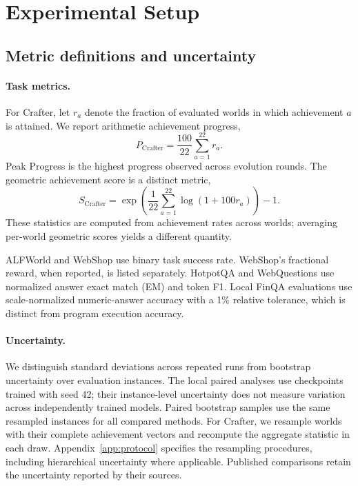 \section{Experimental Setup}
\label{app:setup}

\subsection{Metric definitions and uncertainty}

\paragraph{Task metrics.}
For Crafter, let $r_a$ denote the fraction of evaluated worlds
in which achievement $a$ is attained. We report arithmetic
achievement progress,
\begin{equation}
P_{\mathrm{Crafter}}
=\frac{100}{22}\sum_{a=1}^{22}r_a.
\end{equation}
Peak Progress is the highest progress observed across evolution
rounds. The geometric achievement score is a distinct metric,
\begin{equation}
S_{\mathrm{Crafter}}
=\exp\left(
\frac{1}{22}\sum_{a=1}^{22}\log(1+100r_a)
\right)-1.
\label{eq:crafter}
\end{equation}
These statistics are computed from achievement rates across
worlds; averaging per-world geometric scores yields a different
quantity.

ALFWorld and WebShop use binary task success rate. WebShop's
fractional reward, when reported, is listed separately.
HotpotQA and WebQuestions use normalized answer exact match
(EM) and token F1. Local FinQA evaluations use scale-normalized
numeric-answer accuracy with a 1\% relative tolerance, which
is distinct from program execution accuracy.

\paragraph{Uncertainty.}
We distinguish standard deviations across repeated runs from
bootstrap uncertainty over evaluation instances. The local
paired analyses use checkpoints trained with seed 42; their
instance-level uncertainty does not measure variation across
independently trained models. Paired bootstrap samples use the
same resampled instances for all compared methods. For Crafter,
we resample worlds with their complete achievement vectors and
recompute the aggregate statistic in each draw.
Appendix~\ref{app:protocol} specifies the resampling procedures,
including hierarchical uncertainty where applicable.
Published comparisons retain the uncertainty reported by
their sources.

